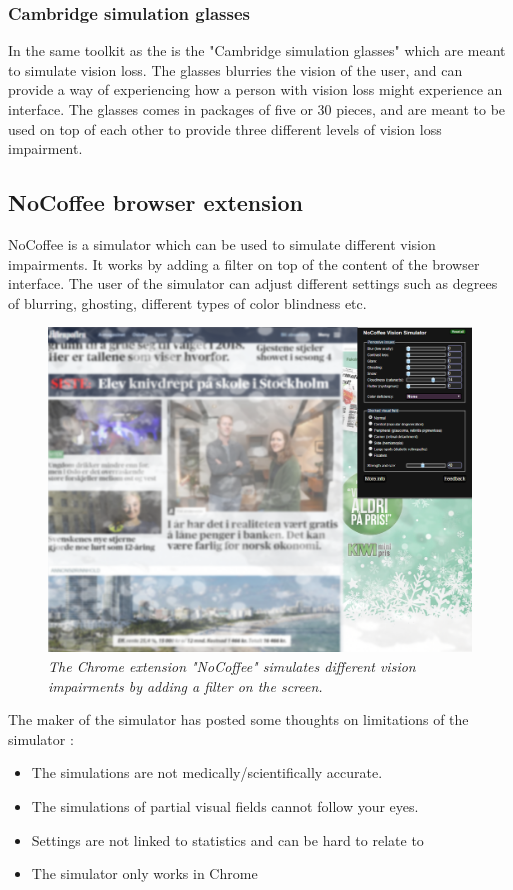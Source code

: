 \subsubsection{Cambridge simulation glasses}
In the same toolkit as the  is the "Cambridge simulation glasses" which are meant to simulate vision loss. The glasses blurries the vision of the user, and can provide a way of experiencing how a person with vision loss might experience an interface. The glasses comes in packages of five or 30 pieces, and are meant to be used on top of each other to provide three different levels of vision loss impairment.

\subsection{NoCoffee browser extension}
NoCoffee is a simulator which can be used to simulate different vision impairments. It works by adding a filter on top of the content of the browser interface. The user of the simulator can adjust different settings such as degrees of blurring, ghosting, different types of color blindness etc.
\begin{figure}[H]
  \includegraphics[width=\linewidth]{img/nocoffee.PNG}
  \caption{\textit{The Chrome extension "NoCoffee" simulates different vision impairments by adding a filter on the screen.}}\label{fig:nocoffee_browser_extension_theory_2}
\endminipage\hfill
\end{figure}

The maker of the simulator has posted some thoughts on limitations of the simulator \parencite{_nocoffee_2013}:
\begin{itemize}
    \item The simulations are not medically/scientifically accurate.
    \item The simulations of partial visual fields cannot follow your eyes.
    \item Settings are not linked to statistics and can be hard to relate to
    \item The simulator only works in Chrome
\end{itemize}

